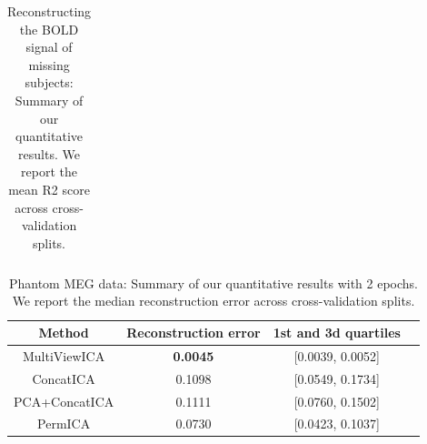 \begin{table}
\begin{tabular}{|c|c | c | c|}
         
    \end{tabular}
    \caption{Reconstructing the BOLD signal of missing subjects: Summary of our quantitative results. We report the mean R2 score across cross-validation splits.}
    \label{tab:recon}
\end{table}

\begin{table}
    \centering
    \begin{tabular}{|c|c|c|c}
    \hline
         \textbf{Method} & \textbf{Reconstruction error} & \textbf{1st and 3d quartiles} 
         \\
         \hline
         MultiViewICA & \textbf{0.0045} & [0.0039, 0.0052] \\ 
ConcatICA & 0.1098 & [0.0549, 0.1734] \\ 
PCA+ConcatICA & 0.1111 & [0.0760, 0.1502] \\ 
PermICA & 0.0730 & [0.0423, 0.1037] \\ 
\hline
    \end{tabular}
    \caption{Phantom MEG data: Summary of our quantitative results with 2 epochs. We report the median reconstruction error across cross-validation splits.}
    \label{tab:meg}
\end{table}

